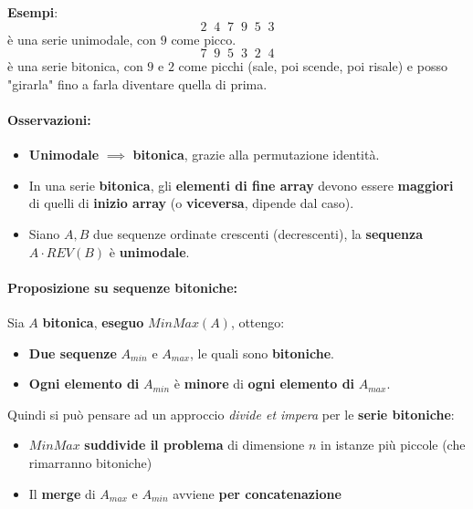 \documentclass[11pt]{article}
\begin{document}
	\newpage
	
	\textbf{Esempi}: 
	$$ 2 \;\; 4 \;\; 7 \;\; 9 \;\; 5 \;\; 3 $$
	è una serie unimodale, con $9$ come picco.\\
	
	$$ 7 \;\; 9 \;\; 5 \;\; 3 \;\; 2 \;\; 4 $$
	è una serie bitonica, con $9$ e $2$ come picchi (sale, poi scende, poi risale) e posso "girarla" fino a farla diventare quella di prima.\\
	
	
	\paragraph{Osservazioni: }
	\begin{itemize}
		\item \textbf{Unimodale} $\implies$ \textbf{bitonica}, grazie alla permutazione identità.\\
		
		\item In una serie \textbf{bitonica}, gli \textbf{elementi di fine array} devono essere \textbf{maggiori} di quelli di \textbf{inizio array} (o \textbf{viceversa}, dipende dal caso).\\
		
		\item Siano $A,B$ due sequenze ordinate crescenti (decrescenti), la \textbf{sequenza} $A \cdot REV(B)$ è \textbf{unimodale}.\\
	\end{itemize}
	
	
	\paragraph{Proposizione su sequenze bitoniche:} Sia $A$ \textbf{bitonica}, \textbf{eseguo} $MinMax(A)$, ottengo:
	\begin{itemize}
		\item \textbf{Due sequenze} $A_{min}$ e $A_{max}$, le quali sono \textbf{bitoniche}.\\
		
		\item \textbf{Ogni elemento di} $A_{min}$ è \textbf{minore} di \textbf{ogni elemento di} $A_{max}$.\\
	\end{itemize}
	
	
	Quindi si può pensare ad un approccio \textit{divide et impera} per le \textbf{serie bitoniche}:
	\begin{itemize}
		\item $MinMax$ \textbf{suddivide il problema} di dimensione $n$ in istanze più piccole (che rimarranno bitoniche)
		
		\item Il \textbf{merge} di $A_{max}$ e $A_{min}$ avviene \textbf{per concatenazione}
	\end{itemize}
	
\end{document}
